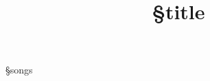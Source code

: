 \documentclass[a4paper,12pt]{article}
\title{§title}
\author{}
\date{}
\begin{document}
\maketitle
§songs
\end{document}
